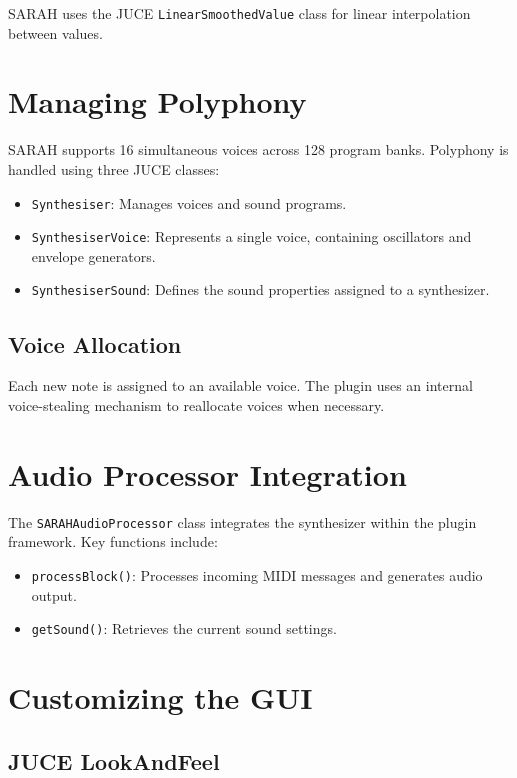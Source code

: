 SARAH uses the JUCE \texttt{LinearSmoothedValue} class for linear interpolation between values.

\section{Managing Polyphony}

SARAH supports 16 simultaneous voices across 128 program banks. Polyphony is handled using three JUCE classes:

\begin{itemize}
    \item \texttt{Synthesiser}: Manages voices and sound programs.
    \item \texttt{SynthesiserVoice}: Represents a single voice, containing oscillators and envelope generators.
    \item \texttt{SynthesiserSound}: Defines the sound properties assigned to a synthesizer.
\end{itemize}

\subsection{Voice Allocation}

Each new note is assigned to an available voice. The plugin uses an internal voice-stealing mechanism to reallocate voices when necessary.

\section{Audio Processor Integration}

The \texttt{SARAHAudioProcessor} class integrates the synthesizer within the plugin framework. Key functions include:

\begin{itemize}
    \item \texttt{processBlock()}: Processes incoming MIDI messages and generates audio output.
    \item \texttt{getSound()}: Retrieves the current sound settings.
\end{itemize}

\section{Customizing the GUI}

\subsection{JUCE LookAndFeel}

